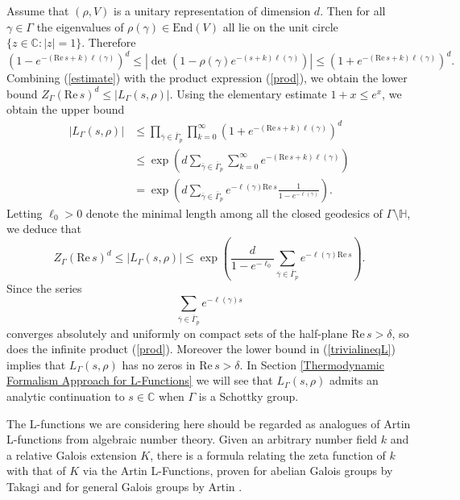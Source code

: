 \documentclass[12pt]{article}
\newcommand{\CC}{\mathbb{C}}
\newcommand{\R}{\mathrm{Re}\,}
\newcommand{\HH}{\mathbb{H}}
\begin{document}
Assume that $ (\rho, V) $ is a unitary representation of dimension $ d $. Then for all $ \gamma\in \Gamma $ the eigenvalues of $ \rho(\gamma)\in \mathrm{End}(V) $ all lie on the unit circle $ \{ z\in \mathbb{C} : \vert z\vert = 1 \}. $ Therefore 
\begin{equation}\label{estimate}
\left( 1-e^{-(\R s+k)\ell(\gamma)}\right)^{d} \leq \left\vert \det\left( 1-\rho(\gamma)e^{-(s+k)\ell(\gamma)}\right)  \right\vert \leq \left( 1+e^{-(\R s+k)\ell(\gamma)}\right)^{d} .
\end{equation}
Combining (\ref{estimate}) with the product expression (\ref{prod}), we obtain the lower bound $ Z_{\Gamma}(\R s)^{d} \leq \vert  L_{\Gamma}(s,\rho)\vert $. Using the elementary estimate $ 1+x\leq e^{x} $, we obtain the upper bound
\begin{align*}
\vert  L_{\Gamma}(s,\rho)\vert &\leq \prod_{\overline{\gamma}\in \overline{\Gamma}_{p}} \prod_{k=0}^{\infty} \left( 1+e^{-(\R s+k)\ell(\gamma)}\right)^{d}\\
&\leq \exp\left( d \sum_{\overline{\gamma}\in \overline{\Gamma}_{p}} \sum_{k=0}^{\infty} e^{-(\R s+k)\ell(\gamma)} \right)\\
&= \exp\left( d \sum_{\overline{\gamma}\in \overline{\Gamma}_{p}} e^{-\ell(\gamma) \R s}\frac{1}{1-e^{-\ell(\gamma)}} \right).
\end{align*}
Letting $ \ell_{0}>0 $ denote the minimal length among all the closed geodesics of $ \Gamma\setminus \HH $, we deduce that
\begin{equation}\label{trivialineqL}
Z_{\Gamma}(\R s)^{d} \leq \vert  L_{\Gamma}(s,\rho)\vert \leq \exp\left( \frac{d}{1-e^{-\ell_{0}}} \sum_{\overline{\gamma}\in \overline{\Gamma}_{p}} e^{-\ell(\gamma) \R s} \right).
\end{equation}
Since the series 
$$ \sum_{\overline{\gamma}\in \overline{\Gamma}_{p}} e^{-\ell(\gamma) s} $$ 
converges absolutely and uniformly on compact sets of the half-plane $ \R s > \delta $, so does the infinite product (\ref{prod}). Moreover the lower bound in (\ref{trivialineqL}) implies that $ L_{\Gamma}(s, \rho) $ has no zeros in $ \R s > \delta $. In Section \ref{Thermodynamic Formalism Approach for L-Functions} we will see that $ L_{\Gamma}(s,\rho) $ admits an analytic continuation to $ s\in \CC $ when $ \Gamma $ is a Schottky group.

The L-functions we are considering here should be regarded as analogues of Artin L-functions from algebraic number theory. Given an arbitrary number field $ k $ and a relative Galois extension $ K $, there is a formula relating the zeta function of $ k $ with that of $ K $ via the Artin L-Functions, proven for abelian Galois groups by Takagi \cite{Takagi} and for general Galois groups by Artin \cite{Artin}. 
\end{document}

